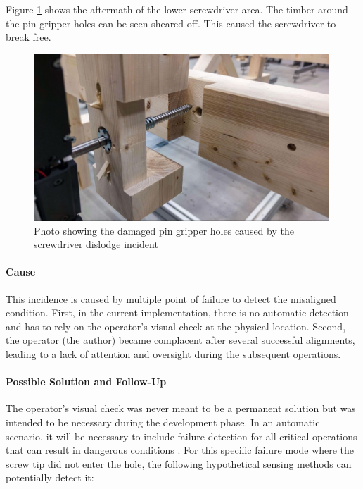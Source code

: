 Figure \ref{fig:damaged-pin-gripper-holes} shows the aftermath of the lower screwdriver area. The timber around the pin gripper holes can be seen sheared off. This caused the screwdriver to break free.

\begin{figure}[!h]
    \centering
    \includegraphics[width=0.99\textwidth]{images/7b/img90.jpg}
    \caption{Photo showing the damaged pin gripper holes caused by the screwdriver dislodge incident}
    \label{fig:damaged-pin-gripper-holes}
\end{figure}


\paragraph{Cause}
This incidence is caused by multiple point of failure to detect the misaligned condition. First, in the current implementation, there is no automatic detection and has to rely on the operator’s visual check at the physical location. 
Second, the operator (the author) became complacent after several successful alignments, leading to a lack of attention and oversight during the subsequent operations.

\paragraph{Possible Solution and Follow-Up}
The operator's visual check was never meant to be a permanent solution but was intended to be necessary during the development phase. In an automatic scenario, it will be necessary to include failure detection for all critical operations that can result in dangerous conditions . For this specific failure mode where the screw tip did not enter the hole, the following hypothetical sensing methods can potentially detect it:

